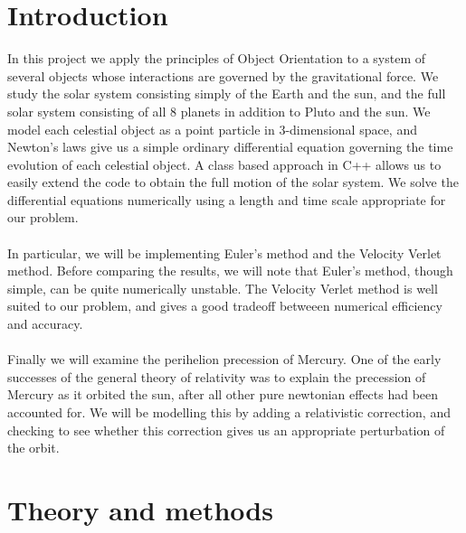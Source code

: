 \documentclass[%
 reprint,
 nobalance,
 amsmath,amssymb,
 aps,
]{revtex4-1}
\begin{document}

\maketitle

\section{\label{sec:Int}Introduction}
In this project we apply the principles of Object Orientation to a system of several objects whose interactions are governed by the gravitational force. We study the solar system consisting simply of the Earth and the sun, and the full solar system consisting of all 8 planets in addition to Pluto and the sun. We model each celestial object as a point particle in 3-dimensional space, and Newton's laws give us a simple ordinary differential equation governing the time evolution of each celestial object. A class based approach in C++ allows us to easily extend the code to obtain the full motion of the solar system. We solve the differential equations numerically using a length and time scale appropriate for our problem. \\ \\
In particular, we will be implementing Euler's method and the Velocity Verlet method. Before comparing the results, we will note that Euler's method, though simple, can be quite numerically unstable. The Velocity Verlet method is well suited to our problem, and gives a good tradeoff betweeen numerical efficiency and accuracy. \\ \\
Finally we will examine the perihelion precession of Mercury. One of the early successes of the general theory of relativity was to explain the precession of Mercury as it orbited the sun, after all other pure newtonian effects had been accounted for. We will be modelling this by adding a relativistic correction, and checking to see whether this correction gives us an appropriate perturbation of the orbit.

\section{\label{sec:The}Theory and methods}
\end{document}
